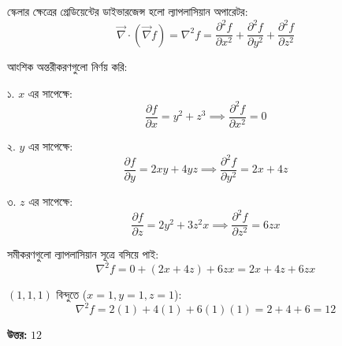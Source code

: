 \documentclass[11pt,a4paper]{article}
\begin{document}
\begin{solbox}
স্কেলার ক্ষেত্রের গ্রেডিয়েন্টের ডাইভারজেন্স হলো ল্যাপলাসিয়ান অপারেটর:
$$\vec{\nabla}\cdot(\vec{\nabla}f) = \nabla^2 f = \frac{\partial^2 f}{\partial x^2} + \frac{\partial^2 f}{\partial y^2} + \frac{\partial^2 f}{\partial z^2}$$

আংশিক অন্তরীকরণগুলো নির্ণয় করি:

১. $x$ এর সাপেক্ষে:
$$\frac{\partial f}{\partial x} = y^2 + z^3 \implies \frac{\partial^2 f}{\partial x^2} = 0$$

২. $y$ এর সাপেক্ষে:
$$\frac{\partial f}{\partial y} = 2xy + 4yz \implies \frac{\partial^2 f}{\partial y^2} = 2x + 4z$$

৩. $z$ এর সাপেক্ষে:
$$\frac{\partial f}{\partial z} = 2y^2 + 3z^2x \implies \frac{\partial^2 f}{\partial z^2} = 6zx$$

সমীকরণগুলো ল্যাপলাসিয়ান সূত্রে বসিয়ে পাই:
$$\nabla^2 f = 0 + (2x + 4z) + 6zx = 2x + 4z + 6zx$$

$(1,1,1)$ বিন্দুতে ($x=1, y=1, z=1$):
$$\nabla^2 f = 2(1) + 4(1) + 6(1)(1) = 2 + 4 + 6 = 12$$

\textbf{উত্তর:} $12$
\end{solbox}
\end{document}
